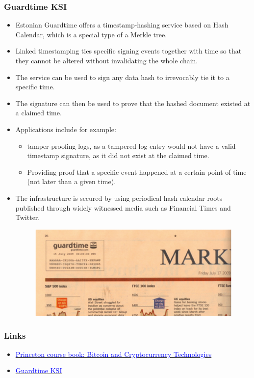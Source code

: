 \documentclass[8pt]{beamer}
\begin{document}
\begin{frame}
\frametitle{Guardtime KSI}
\begin{itemize}
 \item Estonian Guardtime offers a timestamp-hashing service based on Hash Calendar, which is a special type of a Merkle tree.
 \item Linked timestamping ties specific signing events together with time so that they cannot be altered without invalidating the whole chain.
 \item The service can be used to sign any data hash to irrevocably tie it to a specific time.
 \item The signature can then be used to prove that the hashed document existed at a claimed time.
 \item Applications include for example:
 \begin{itemize}
   \item tamper-proofing logs, as a tampered log entry would not have a valid timestamp signature, as it did not exist at the claimed time.
   \item Providing proof that a specific event happened at a certain point of time (not later than a given time).
 \end{itemize}
 \item The infrastructure is secured by using periodical hash calendar roots published through widely witnessed media such as Financial Times and Twitter.
\begin{figure}[tb]
 \centering
 \includegraphics[width=3 cm,keepaspectratio=true]{./blockchain_images/widely_witnessed_media.png}
\end{figure}
\end{itemize}

\end{frame}

\begin{frame}
\frametitle{Links}
\begin{itemize}
 \item \href{https://d28rh4a8wq0iu5.cloudfront.net/bitcointech/readings/princeton\_bitcoin\_book.pdf?a=1}{\textcolor{blue}{Princeton course book: Bitcoin and Cryptocurrency Technologies}}
 \item \href{https://guardtime.com/technology/ksi-technology}{\textcolor{blue}{Guardtime KSI}}
\end{itemize}
\end{frame}
\end{document}
